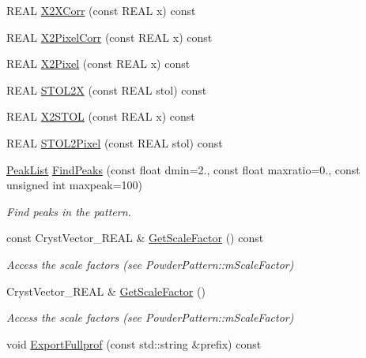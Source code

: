 \begin{DoxyCompactItemize}
R\+E\+AL \mbox{\hyperlink{class_obj_cryst_1_1_powder_pattern_ad335f35d93beb9b269e003a4474c81f0}{X2\+X\+Corr}} (const R\+E\+AL x) const
\item 
R\+E\+AL \mbox{\hyperlink{class_obj_cryst_1_1_powder_pattern_a863415fc0586da70ea29600ffe01d954}{X2\+Pixel\+Corr}} (const R\+E\+AL x) const
\item 
R\+E\+AL \mbox{\hyperlink{class_obj_cryst_1_1_powder_pattern_a0146d35bdc502a6f40f006de837fb490}{X2\+Pixel}} (const R\+E\+AL x) const
\item 
R\+E\+AL \mbox{\hyperlink{class_obj_cryst_1_1_powder_pattern_a05a4b659555b91a3996b016358168ae0}{S\+T\+O\+L2X}} (const R\+E\+AL stol) const
\item 
R\+E\+AL \mbox{\hyperlink{class_obj_cryst_1_1_powder_pattern_a01aefd92417913f4b3514b6c08afbaf7}{X2\+S\+T\+OL}} (const R\+E\+AL x) const
\item 
R\+E\+AL \mbox{\hyperlink{class_obj_cryst_1_1_powder_pattern_ab479aca62d7dd2742442229474423a02}{S\+T\+O\+L2\+Pixel}} (const R\+E\+AL stol) const
\item 
\mbox{\label{class_obj_cryst_1_1_powder_pattern_ad9de9c25681448972d968ec992534a2f}} 
\mbox{\hyperlink{class_obj_cryst_1_1_peak_list}{Peak\+List}} \mbox{\hyperlink{class_obj_cryst_1_1_powder_pattern_ad9de9c25681448972d968ec992534a2f}{Find\+Peaks}} (const float dmin=2., const float maxratio=0., const unsigned int maxpeak=100)
\begin{DoxyCompactList}\small\item\em Find peaks in the pattern. \end{DoxyCompactList}\item 
\mbox{\label{class_obj_cryst_1_1_powder_pattern_af158ea73e0f14e180c7cdab0fc3727a2}} 
const Cryst\+Vector\+\_\+\+R\+E\+AL \& \mbox{\hyperlink{class_obj_cryst_1_1_powder_pattern_af158ea73e0f14e180c7cdab0fc3727a2}{Get\+Scale\+Factor}} () const
\begin{DoxyCompactList}\small\item\em Access the scale factors (see Powder\+Pattern\+::m\+Scale\+Factor) \end{DoxyCompactList}\item 
\mbox{\label{class_obj_cryst_1_1_powder_pattern_a0925b8fc5429dda656ff45c2e37a4610}} 
Cryst\+Vector\+\_\+\+R\+E\+AL \& \mbox{\hyperlink{class_obj_cryst_1_1_powder_pattern_a0925b8fc5429dda656ff45c2e37a4610}{Get\+Scale\+Factor}} ()
\begin{DoxyCompactList}\small\item\em Access the scale factors (see Powder\+Pattern\+::m\+Scale\+Factor) \end{DoxyCompactList}\item 
void \mbox{\hyperlink{class_obj_cryst_1_1_powder_pattern_a5fbc48a5536415de925a4afbb4e6122b}{Export\+Fullprof}} (const std\+::string \&prefix) const
\end{DoxyCompactItemize}
